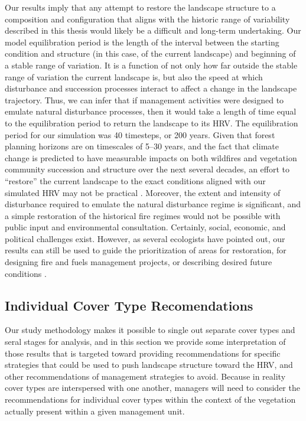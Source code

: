 
Our results imply that any attempt to restore the landscape structure to a composition and configuration that aligns with the historic range of variability described in this thesis would likely be a difficult and long-term undertaking. Our model equilibration period is the length of the interval between the starting condition and structure (in this case, of the current landscape) and beginning of a stable range of variation. It is a function of not only how far outside the stable range of variation the current landscape is, but also the speed at which disturbance and succession processes interact to affect a change in the landscape trajectory. Thus, we can infer that if management activities were designed to emulate natural disturbance processes, then it would take a length of time equal to the equilibration period to return the landscape to its HRV. The equilibration period for our simulation was 40 timesteps, or 200 years. Given that forest planning horizons are on timescales of 5--30 years, and the fact that climate change is predicted to have measurable impacts on both wildfires and vegetation community succession and structure over the next several decades, an effort to ``restore'' the current landscape to the exact conditions aligned with our simulated HRV may not be practical \citep{Millar1999,Millar2014}. Moreover, the extent and intensity of disturbance required to emulate the natural disturbance regime is significant, and a simple restoration of the historical fire regimes would not be possible with public input and environmental consultation. Certainly, social, economic, and political challenges exist. However, as several ecologists have pointed out, our results can still be used to guide the prioritization of areas for restoration, for designing fire and fuels management projects, or describing desired future conditions \citep{Safford2013,Keeley2000}.



\subsection{Individual Cover Type Recomendations}
Our study methodology makes it possible to single out separate cover types and seral stages for analysis, and in this section we provide some interpretation of those results that is targeted toward providing recommendations for specific strategies that could be used to push landscape structure toward the HRV, and other recommendations of management strategies to avoid. Because in reality cover types are interspersed with one another, managers will need to consider the recommendations for individual cover types within the context of the vegetation actually present within a given management unit.

